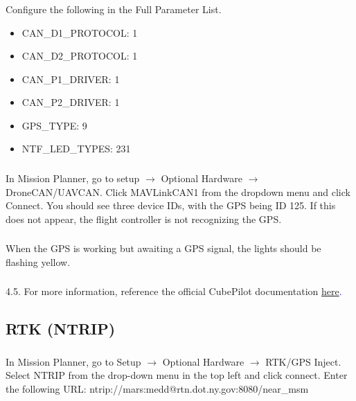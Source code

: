             \subsubsection{} Configure the following in the Full Parameter List.
                \begin{itemize}
                    \item CAN\_D1\_PROTOCOL: 1
                    \item CAN\_D2\_PROTOCOL: 1
                    \item CAN\_P1\_DRIVER: 1
                    \item CAN\_P2\_DRIVER: 1
                    \item GPS\_TYPE: 9
                    \item NTF\_LED\_TYPES: 231
                \end{itemize} 
            \subsubsection{} In Mission Planner, go to setup $\rightarrow$ Optional Hardware $\rightarrow$ DroneCAN/UAVCAN. Click MAVLinkCAN1 from the dropdown menu and click Connect. You should see three device IDs, with the GPS being ID 125. If this does not appear, the flight controller is not recognizing the GPS.
            \subsubsection{} When the GPS is working but awaiting a GPS signal, the lights should be flashing yellow.
            \subsubsection{} 4.5.	For more information, reference the official CubePilot documentation \textcolor{blue}{\href{https://docs.cubepilot.org/user-guides/here-4/here-4-manual}{here}.}
            
        \subsection{RTK (NTRIP)}
            
            \subsubsection{} In Mission Planner, go to Setup $\rightarrow$ Optional Hardware $\rightarrow$ RTK/GPS Inject. Select NTRIP from the drop-down menu in the top left and click connect. Enter the following URL: ntrip://mars:medd@rtn.dot.ny.gov:8080/near\_msm
